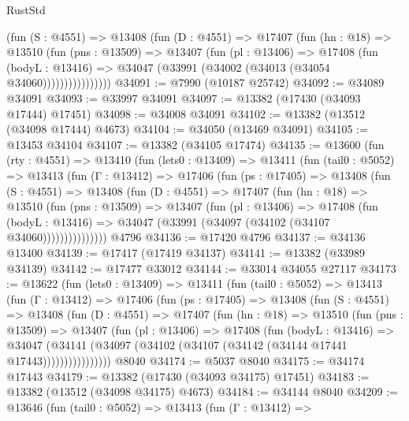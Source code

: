 \begin{lexlean}{RustStd}
\begin{coremodule}
                (fun (S : @4551) =>
                @13408
                  (fun (D : @4551) =>
                  @17407
                    (fun (hn : @18) =>
                    @13510
                      (fun (pns : @13509) =>
                      @13407
                        (fun (pl : @13406) =>
                        @17408
                          (fun (bodyL : @13416) =>
                          @34047 (@33991 (@34002 (@34013 (@34054 @34060))))))))))))))))
@34091 := @7990 (@10187 @25742)
@34092 := @34089 @34091
@34093 := @33997 @34091
@34097 := @13382 (@17430 (@34093 @17444) @17451)
@34098 := @34008 @34091
@34102 := @13382 (@13512 (@34098 @17444) @4673)
@34104 := @34050 (@13469 @34091)
@34105 := @13453 @34104
@34107 := @13382 (@34105 @17474)
@34135 := @13600
    (fun (rty : @4551) =>
    @13410
      (fun (lets0 : @13409) =>
      @13411
        (fun (tail0 : @5052) =>
        @13413
          (fun (Γ : @13412) =>
          @17406
            (fun (ps : @17405) =>
            @13408
              (fun (S : @4551) =>
              @13408
                (fun (D : @4551) =>
                @17407
                  (fun (hn : @18) =>
                  @13510
                    (fun (pns : @13509) =>
                    @13407
                      (fun (pl : @13406) =>
                      @17408
                        (fun (bodyL : @13416) =>
                        @34047 (@33991 (@34097 (@34102 (@34107 @34060)))))))))))))))
    @4796
@34136 := @17420 @4796
@34137 := @34136 @13400
@34139 := @17417 (@17419 @34137)
@34141 := @13382 (@33989 @34139)
@34142 := @17477 @33012
@34144 := @33014 @34055 @27117
@34173 := @13622
    (fun (lets0 : @13409) =>
    @13411
      (fun (tail0 : @5052) =>
      @13413
        (fun (Γ : @13412) =>
        @17406
          (fun (ps : @17405) =>
          @13408
            (fun (S : @4551) =>
            @13408
              (fun (D : @4551) =>
              @17407
                (fun (hn : @18) =>
                @13510
                  (fun (pns : @13509) =>
                  @13407
                    (fun (pl : @13406) =>
                    @17408
                      (fun (bodyL : @13416) =>
                      @34047
                        (@34141
                          (@34097 (@34102 (@34107 (@34142 (@34144 @17441 @17443))))))))))))))))
    @8040
@34174 := @5037 @8040
@34175 := @34174 @17443
@34179 := @13382 (@17430 (@34093 @34175) @17451)
@34183 := @13382 (@13512 (@34098 @34175) @4673)
@34184 := @34144 @8040
@34209 := @13646
    (fun (tail0 : @5052) =>
    @13413
      (fun (Γ : @13412) =>

\end{coremodule}
\end{lexlean}
